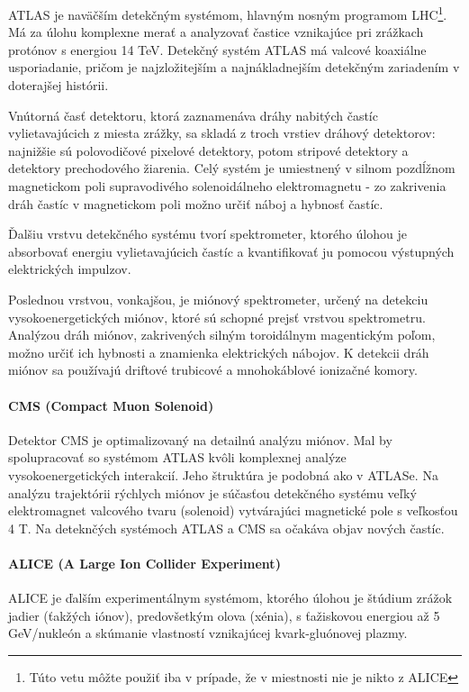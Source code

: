 \documentclass[../../main.tex]{subfiles}
\begin{document}
ATLAS je naväčším detekčným systémom, hlavným nosným programom LHC\footnote{Túto vetu môžte použiť iba v prípade, že v miestnosti nie je nikto z ALICE}. Má za úlohu komplexne merať a analyzovať častice vznikajúce pri zrážkach protónov s energiou 14 TeV. Detekčný systém ATLAS má valcové koaxiálne usporiadanie, pričom je najzložitejším a najnákladnejším detekčným zariadením v doterajšej histórii.

Vnútorná časť detektoru, ktorá zaznamenáva dráhy nabitých častíc vylietavajúcich z miesta zrážky, sa skladá z troch vrstiev dráhový detektorov: najnižšie sú polovodičové pixelové detektory, potom stripové detektory a detektory prechodového žiarenia. Celý systém je umiestnený v silnom pozdĺžnom magnetickom poli supravodivého solenoidálneho elektromagnetu - zo zakrivenia dráh častíc v magnetickom poli možno určiť náboj a hybnosť častíc.

Ďalšiu vrstvu detekčného systému tvorí spektrometer, ktorého úlohou je absorbovať energiu vylietavajúcich častíc a kvantifikovať ju pomocou výstupných elektrických impulzov.

Poslednou vrstvou, vonkajšou, je miónový spektrometer, určený na detekciu vysokoenergetických miónov, ktoré sú schopné prejsť vrstvou spektrometru. Analýzou dráh miónov, zakrivených silným toroidálnym magentickým poľom, možno určiť ich hybnosti a znamienka elektrických nábojov. K detekcii dráh miónov sa používajú driftové trubicové a mnohokáblové ionizačné komory.

\paragraph{CMS (Compact Muon Solenoid)}
Detektor CMS je optimalizovaný na detailnú analýzu miónov. Mal by spolupracovať so systémom ATLAS kvôli komplexnej analýze vysokoenergetických interakcií. Jeho štruktúra je podobná ako v ATLASe. Na analýzu trajektórii rýchlych miónov je súčasťou detekčného systému veľký elektromagnet valcového tvaru (solenoid) vytvárajúci magnetické pole s veľkosťou 4 T. Na deteknčých systémoch ATLAS a CMS sa očakáva objav nových častíc.

\paragraph{ALICE (A Large Ion Collider Experiment)}

ALICE je ďalším experimentálnym systémom, ktorého úlohou je štúdium zrážok jadier (ťakžých iónov), predovšetkým olova (xénia), s ťažiskovou energiou až 5 GeV/nukleón a skúmanie vlastností vznikajúcej kvark-gluónovej plazmy.
\end{document}
